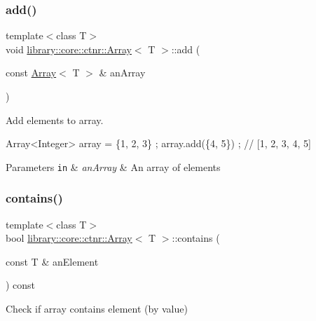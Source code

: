 \subsubsection{\texorpdfstring{add()}{add()}\hspace{0.1cm}{\footnotesize\ttfamily [2/2]}}
{\footnotesize\ttfamily template$<$class T$>$ \\
void \hyperlink{classlibrary_1_1core_1_1ctnr_1_1_array}{library\+::core\+::ctnr\+::\+Array}$<$ T $>$\+::add (\begin{DoxyParamCaption}\item[{const \hyperlink{classlibrary_1_1core_1_1ctnr_1_1_array}{Array}$<$ T $>$ \&}]{an\+Array }\end{DoxyParamCaption})}



Add elements to array. 


\begin{DoxyCode}
Array<Integer> array = \{1, 2, 3\} ;
array.add(\{4, 5\}) ; \textcolor{comment}{// [1, 2, 3, 4, 5]}
\end{DoxyCode}



\begin{DoxyParams}[1]{Parameters}
\mbox{\tt in}  & {\em an\+Array} & An array of elements \\
\hline
\end{DoxyParams}
\mbox{\label{classlibrary_1_1core_1_1ctnr_1_1_array_a9c423eb8a34dddc81e0ede9435094e99}} 
\subsubsection{\texorpdfstring{contains()}{contains()}}
{\footnotesize\ttfamily template$<$class T$>$ \\
bool \hyperlink{classlibrary_1_1core_1_1ctnr_1_1_array}{library\+::core\+::ctnr\+::\+Array}$<$ T $>$\+::contains (\begin{DoxyParamCaption}\item[{const T \&}]{an\+Element }\end{DoxyParamCaption}) const}



Check if array contains element (by value) 


